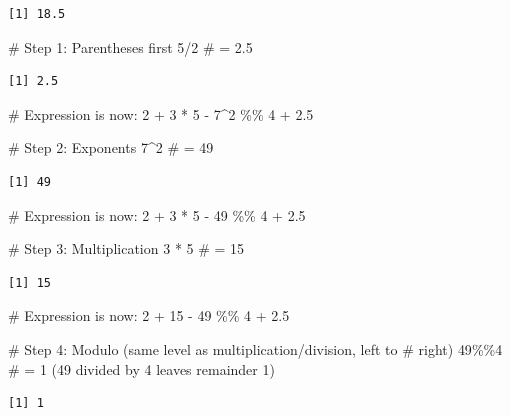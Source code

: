 \documentclass[
  letterpaper,
  DIV=11,
  numbers=noendperiod]{scrreprt}
\newenvironment{Shaded}{\begin{snugshade}}{\end{snugshade}}
\newcommand{\CommentTok}[1]{\textcolor[rgb]{0.37,0.37,0.37}{#1}}
\newcommand{\DecValTok}[1]{\textcolor[rgb]{0.68,0.00,0.00}{#1}}
\newcommand{\SpecialCharTok}[1]{\textcolor[rgb]{0.37,0.37,0.37}{#1}}
\begin{document}
\begin{verbatim}
[1] 18.5
\end{verbatim}

\begin{Shaded}
\begin{Highlighting}[]
\CommentTok{\# Step 1: Parentheses first}
\DecValTok{5}\SpecialCharTok{/}\DecValTok{2}  \CommentTok{\# = 2.5}
\end{Highlighting}
\end{Shaded}

\begin{verbatim}
[1] 2.5
\end{verbatim}

\begin{Shaded}
\begin{Highlighting}[]
\CommentTok{\# Expression is now: 2 + 3 * 5 {-} 7\^{}2 \%\% 4 + 2.5}

\CommentTok{\# Step 2: Exponents}
\DecValTok{7}\SpecialCharTok{\^{}}\DecValTok{2}  \CommentTok{\# = 49}
\end{Highlighting}
\end{Shaded}

\begin{verbatim}
[1] 49
\end{verbatim}

\begin{Shaded}
\begin{Highlighting}[]
\CommentTok{\# Expression is now: 2 + 3 * 5 {-} 49 \%\% 4 + 2.5}

\CommentTok{\# Step 3: Multiplication}
\DecValTok{3} \SpecialCharTok{*} \DecValTok{5}  \CommentTok{\# = 15}
\end{Highlighting}
\end{Shaded}

\begin{verbatim}
[1] 15
\end{verbatim}

\begin{Shaded}
\begin{Highlighting}[]
\CommentTok{\# Expression is now: 2 + 15 {-} 49 \%\% 4 + 2.5}

\CommentTok{\# Step 4: Modulo (same level as multiplication/division, left to}
\CommentTok{\# right)}
\DecValTok{49}\SpecialCharTok{\%\%}\DecValTok{4}  \CommentTok{\# = 1  (49 divided by 4 leaves remainder 1)}
\end{Highlighting}
\end{Shaded}

\begin{verbatim}
[1] 1
\end{verbatim}
\end{document}
